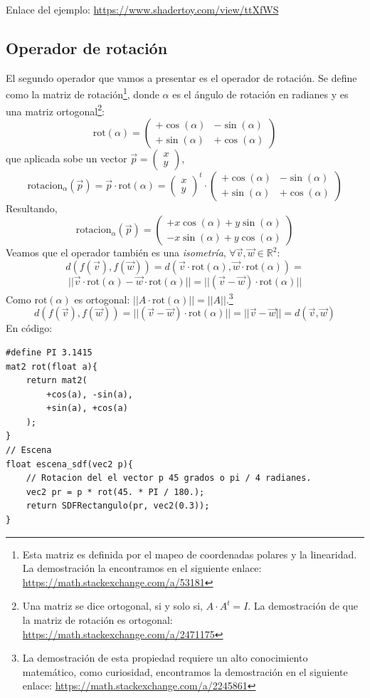 Enlace del ejemplo:
\url{https://www.shadertoy.com/view/ttXfWS}

\subsection{Operador de rotación}
El segundo operador que vamos a presentar es el operador de rotación. Se define como la matriz de rotación\footnote{Esta matriz es definida por el mapeo de coordenadas polares y la linearidad. La demostración la encontramos en el siguiente enlace: \url{https://math.stackexchange.com/a/53181}}, donde \(\alpha\) es el ángulo de rotación en radianes y es una matriz ortogonal\footnote{Una matriz se dice ortogonal, si y solo si, \(A\cdot A^t=I\). La demostración de que la matriz de rotación es ortogonal:  \url{https://math.stackexchange.com/a/2471175}}:
\[ 
\text{rot}(\alpha)=\begin{pmatrix}
    +\cos(\alpha) & -\sin(\alpha)\\
    +\sin(\alpha) & +\cos(\alpha)
\end{pmatrix}
\]
que aplicada sobe un vector \(\Vec{p}=\begin{pmatrix}
    x\\
    y
\end{pmatrix}\),
\[ 
\text{rotacion}_\alpha(\Vec{p})=\Vec{p}\cdot\text{rot}(\alpha)=\begin{pmatrix}
    x\\
    y
\end{pmatrix}^t\cdot\begin{pmatrix}
    +\cos(\alpha) & -\sin(\alpha)\\
    +\sin(\alpha) & +\cos(\alpha)
\end{pmatrix}
\]
Resultando,
\[\text{rotacion}_\alpha(\Vec{p})=\begin{pmatrix}
    +x\cos(\alpha) + y\sin(\alpha)\\
    -x\sin(\alpha) + y\cos(\alpha)
\end{pmatrix}
\]
Veamos que el operador también es una \textit{isometría}, \(\forall \Vec{v},\Vec{w}\in\mathbb{R}^2\):
\[d(f(\Vec{v}), f(\Vec{w}))=d(\Vec{v}\cdot \text{rot}(\alpha), \Vec{w}\cdot \text{rot}(\alpha))=\]\[\vert\vert \Vec{v}\cdot \text{rot}(\alpha)- \Vec{w}\cdot \text{rot}(\alpha)\vert\vert=\vert\vert(\Vec{v}-\Vec{w})\cdot \text{rot}(\alpha)\vert\vert\]
Como \(\text{rot}(\alpha)\) es ortogonal: \(\vert\vert A\cdot\text{rot}(\alpha)\vert\vert=\vert\vert A\vert\vert\).\footnote{La demostración de esta propiedad requiere un alto conocimiento matemático, como curiosidad, encontramos la demostración en el siguiente enlace: \url{https://math.stackexchange.com/a/2245861}}
\[d(f(\Vec{v}), f(\Vec{w}))=\vert\vert(\Vec{v}-\Vec{w})\cdot \text{rot}(\alpha)\vert\vert=\vert\vert\Vec{v}-\Vec{w}\vert\vert=d(\Vec{v},\Vec{w})\]
En código:
\begin{lstlisting}
#define PI 3.1415
mat2 rot(float a){
    return mat2(
        +cos(a), -sin(a), 
        +sin(a), +cos(a)
    );
}
// Escena
float escena_sdf(vec2 p){
    // Rotacion del el vector p 45 grados o pi / 4 radianes.
    vec2 pr = p * rot(45. * PI / 180.);
    return SDFRectangulo(pr, vec2(0.3));
}
\end{lstlisting}

